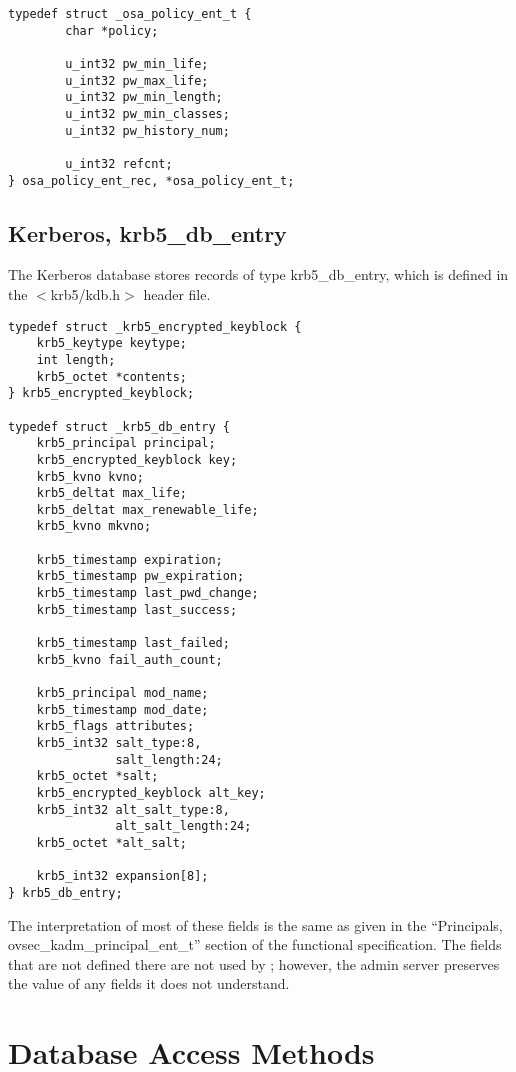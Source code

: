 \begin{verbatim}
typedef struct _osa_policy_ent_t {
        char *policy;

        u_int32 pw_min_life;
        u_int32 pw_max_life;
        u_int32 pw_min_length;
        u_int32 pw_min_classes;
        u_int32 pw_history_num;

        u_int32 refcnt;
} osa_policy_ent_rec, *osa_policy_ent_t;
\end{verbatim}

\subsection{Kerberos, krb5_db_entry}

The Kerberos database stores records of type krb5_db_entry, which is
defined in the $<$krb5/kdb.h$>$ header file.

\begin{verbatim}
typedef struct _krb5_encrypted_keyblock {
    krb5_keytype keytype;
    int length;
    krb5_octet *contents;
} krb5_encrypted_keyblock;

typedef struct _krb5_db_entry {
    krb5_principal principal;
    krb5_encrypted_keyblock key;
    krb5_kvno kvno;
    krb5_deltat max_life;
    krb5_deltat max_renewable_life;
    krb5_kvno mkvno;
    
    krb5_timestamp expiration;
    krb5_timestamp pw_expiration;
    krb5_timestamp last_pwd_change;
    krb5_timestamp last_success;   
    
    krb5_timestamp last_failed;
    krb5_kvno fail_auth_count;
    
    krb5_principal mod_name;
    krb5_timestamp mod_date;
    krb5_flags attributes;
    krb5_int32 salt_type:8,
               salt_length:24;
    krb5_octet *salt;
    krb5_encrypted_keyblock alt_key;
    krb5_int32 alt_salt_type:8,
               alt_salt_length:24;
    krb5_octet *alt_salt;
    
    krb5_int32 expansion[8];
} krb5_db_entry;
\end{verbatim}

The interpretation of most of these fields is the same as given in the
``Principals, ovsec_kadm_principal_ent_t'' section of the functional
specification.  The fields that are not defined there are not used by
\secure{}; however, the admin server preserves the value of any fields
it does not understand.

\section{Database Access Methods}

